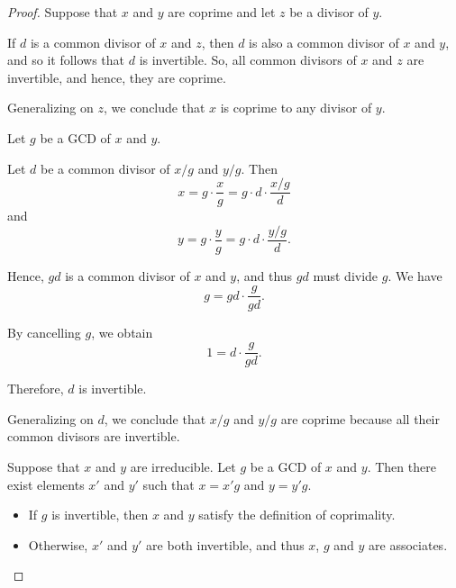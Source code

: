 \begin{proof}
   Suppose that \( x \) and \( y \) are coprime and let \( z \) be a divisor of \( y \).

  If \( d \) is a common divisor of \( x \) and \( z \), then \( d \) is also a common divisor of \( x \) and \( y \), and so it follows that \( d \) is invertible. So, all common divisors of \( x \) and \( z \) are invertible, and hence, they are coprime.

  Generalizing on \( z \), we conclude that \( x \) is coprime to any divisor of \( y \).

   Let \( g \) be a GCD of \( x \) and \( y \).

  Let \( d \) be a common divisor of \( x / g \) and \( y / g \). Then
  \begin{equation*}
    x = g \cdot \frac x g = g \cdot d \cdot \frac {x / g} d
  \end{equation*}
  and
  \begin{equation*}
    y = g \cdot \frac y g = g \cdot d \cdot \frac {y / g} d.
  \end{equation*}

  Hence, \( gd \) is a common divisor of \( x \) and \( y \), and thus \( gd \) must divide \( g \). We have
  \begin{equation*}
    g = gd \cdot \frac g {gd}.
  \end{equation*}

  By cancelling \( g \), we obtain
  \begin{equation*}
    1 = d \cdot \frac g {gd}.
  \end{equation*}

  Therefore, \( d \) is invertible.

  Generalizing on \( d \), we conclude that \( x / g \) and \( y / g \) are coprime because all their common divisors are invertible.

   Suppose that \( x \) and \( y \) are irreducible. Let \( g \) be a GCD of \( x \) and \( y \). Then there exist elements \( x' \) and \( y' \) such that \( x = x'g \) and \( y = y'g \).

  \begin{itemize}
    \item If \( g \) is invertible, then \( x \) and \( y \) satisfy the definition of coprimality.
    \item Otherwise, \( x' \) and \( y' \) are both invertible, and thus \( x \), \( g \) and \( y \) are associates.
  \end{itemize}


\end{proof}
